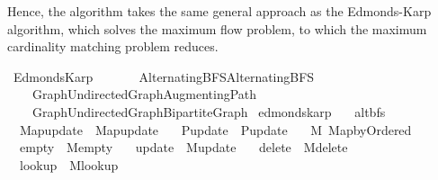 \begin{isabellebody}
\begin{isamarkuptext}
Hence, the algorithm takes the same general approach as the Edmonds-Karp algorithm, which solves the
maximum flow problem, to which the maximum cardinality matching problem reduces.%
\end{isamarkuptext}\isamarkuptrue%
%
\isadelimtheory
%
\endisadelimtheory
%
\isatagtheory
{}\isamarkupfalse%
\ Edmonds{\isacharunderscore}{\kern0pt}Karp\isanewline
\ \ \isanewline
\ \ \ \ {\isachardoublequoteopen}{\isachardot}{\kern0pt}{\isachardot}{\kern0pt}{\isacharslash}{\kern0pt}Alternating{\isacharunderscore}{\kern0pt}BFS{\isacharslash}{\kern0pt}Alternating{\isacharunderscore}{\kern0pt}BFS{\isachardoublequoteclose}\isanewline
\ \ \ \ {\isachardoublequoteopen}{\isachardot}{\kern0pt}{\isachardot}{\kern0pt}{\isacharslash}{\kern0pt}Graph{\isacharslash}{\kern0pt}Undirected{\isacharunderscore}{\kern0pt}Graph{\isacharslash}{\kern0pt}Augmenting{\isacharunderscore}{\kern0pt}Path{\isachardoublequoteclose}\isanewline
\ \ \ \ {\isachardoublequoteopen}{\isachardot}{\kern0pt}{\isachardot}{\kern0pt}{\isacharslash}{\kern0pt}Graph{\isacharslash}{\kern0pt}Undirected{\isacharunderscore}{\kern0pt}Graph{\isacharslash}{\kern0pt}Bipartite{\isacharunderscore}{\kern0pt}Graph{\isachardoublequoteclose}\isanewline
{}%
\endisatagtheory
{\isafoldtheory}%
%
\isadelimtheory
%
\endisadelimtheory
%
\isadelimdocument
%
\endisadelimdocument
%
\isatagdocument
%
\isamarkuptrue%
%
\endisatagdocument
{\isafolddocument}%
%
\isadelimdocument
%
\endisadelimdocument
{}\isamarkupfalse%
\ edmonds{\isacharunderscore}{\kern0pt}karp\ {\isacharequal}{\kern0pt}\isanewline
\ \ alt{\isacharunderscore}{\kern0pt}bfs\ \isanewline
\ \ Map{\isacharunderscore}{\kern0pt}update\ {\isacharequal}{\kern0pt}\ Map{\isacharunderscore}{\kern0pt}update\ \isanewline
\ \ P{\isacharunderscore}{\kern0pt}update\ {\isacharequal}{\kern0pt}\ P{\isacharunderscore}{\kern0pt}update\ {\isacharplus}{\kern0pt}\isanewline
\ \ M{\isacharcolon}{\kern0pt}\ Map{\isacharunderscore}{\kern0pt}by{\isacharunderscore}{\kern0pt}Ordered\ \isanewline
\ \ empty\ {\isacharequal}{\kern0pt}\ M{\isacharunderscore}{\kern0pt}empty\ \isanewline
\ \ update\ {\isacharequal}{\kern0pt}\ M{\isacharunderscore}{\kern0pt}update\ \isanewline
\ \ delete\ {\isacharequal}{\kern0pt}\ M{\isacharunderscore}{\kern0pt}delete\ \isanewline
\ \ lookup\ {\isacharequal}{\kern0pt}\ M{\isacharunderscore}{\kern0pt}lookup\ \isanewline

\end{isabellebody}
